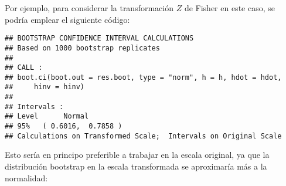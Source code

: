 \documentclass[
]{book}
\newenvironment{Shaded}{\begin{snugshade}}{\end{snugshade}}
\newcommand{\AttributeTok}[1]{\textcolor[rgb]{0.77,0.63,0.00}{#1}}
\newcommand{\CommentTok}[1]{\textcolor[rgb]{0.56,0.35,0.01}{\textit{#1}}}
\newcommand{\ControlFlowTok}[1]{\textcolor[rgb]{0.13,0.29,0.53}{\textbf{#1}}}
\newcommand{\DecValTok}[1]{\textcolor[rgb]{0.00,0.00,0.81}{#1}}
\newcommand{\FunctionTok}[1]{\textcolor[rgb]{0.00,0.00,0.00}{#1}}
\newcommand{\NormalTok}[1]{#1}
\newcommand{\OtherTok}[1]{\textcolor[rgb]{0.56,0.35,0.01}{#1}}
\newcommand{\SpecialCharTok}[1]{\textcolor[rgb]{0.00,0.00,0.00}{#1}}
\newcommand{\StringTok}[1]{\textcolor[rgb]{0.31,0.60,0.02}{#1}}
\theoremstyle{break}
\theoremstyle{definition}
\theoremstyle{definition}
\theoremstyle{definition}
\theoremstyle{definition}
\theoremstyle{remark}
\begin{document}
Por ejemplo, para considerar la transformación \(Z\) de Fisher en este caso, se podría emplear el siguiente código:

\begin{Shaded}
\end{Shaded}

\begin{verbatim}
## BOOTSTRAP CONFIDENCE INTERVAL CALCULATIONS
## Based on 1000 bootstrap replicates
## 
## CALL : 
## boot.ci(boot.out = res.boot, type = "norm", h = h, hdot = hdot, 
##     hinv = hinv)
## 
## Intervals : 
## Level      Normal        
## 95%   ( 0.6016,  0.7858 )  
## Calculations on Transformed Scale;  Intervals on Original Scale
\end{verbatim}

Esto sería en principo preferible a trabajar en la escala original, ya que la distribución bootstrap en la escala transformada se aproximaría más a la normalidad:
\end{document}
